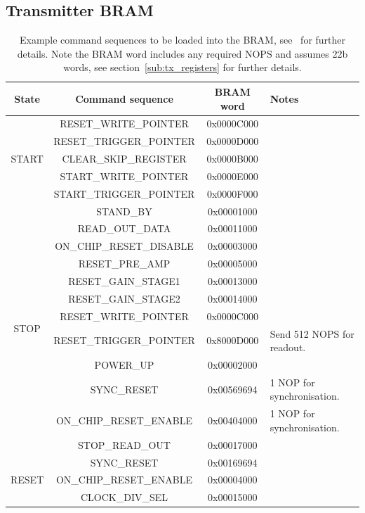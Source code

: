 \subsection{Transmitter BRAM} %
\label{sub:basic_transmitter_bram}
\begin{table}
  \begin{center}
    \begin{tabular}{c|c|c|l}
      State & Command sequence & BRAM word & Notes \\
      \hline
      \multirow{5}{*}{START}  
      & RESET\_WRITE\_POINTER   & 0x0000C000 & \\
      & RESET\_TRIGGER\_POINTER & 0x0000D000 & \\
      & CLEAR\_SKIP\_REGISTER   & 0x0000B000 & \\
      & START\_WRITE\_POINTER   & 0x0000E000 & \\
      & START\_TRIGGER\_POINTER & 0x0000F000 & \\
      \hline
      \multirow{12}{*}{STOP} 
      & STAND\_BY                & 0x00001000 & \\
      & READ\_OUT\_DATA          & 0x00011000 & \\
      & ON\_CHIP\_RESET\_DISABLE & 0x00003000 & \\
      & RESET\_PRE\_AMP          & 0x00005000 & \\
      & RESET\_GAIN\_STAGE1      & 0x00013000 & \\
      & RESET\_GAIN\_STAGE2      & 0x00014000 & \\
      & RESET\_WRITE\_POINTER    & 0x0000C000 & \\
      & RESET\_TRIGGER\_POINTER  & 0x8000D000 & Send 512 NOPS for readout. \\
      & POWER\_UP                & 0x00002000 & \\
      & SYNC\_RESET              & 0x00569694 & 1 NOP for synchronisation. \\
      & ON\_CHIP\_RESET\_ENABLE  & 0x00404000 & 1 NOP for synchronisation. \\
      & STOP\_READ\_OUT          & 0x00017000 & \\
      \hline
      \multirow{3}{*}{RESET} 
      & SYNC\_RESET              & 0x00169694 & \\
      & ON\_CHIP\_RESET\_ENABLE  & 0x00004000 & \\
      & CLOCK\_DIV\_SEL          & 0x00015000 & \\
    \end{tabular}
  \end{center}
  \caption{Example command sequences to be loaded into the BRAM, see~\cite{lpd_manual} for further details. Note the BRAM word includes any required NOPS and assumes 22b words, see section~\ref{sub:tx_registers} for further details.}
  \label{tab:basic_tx_bram_vals}
\end{table}
